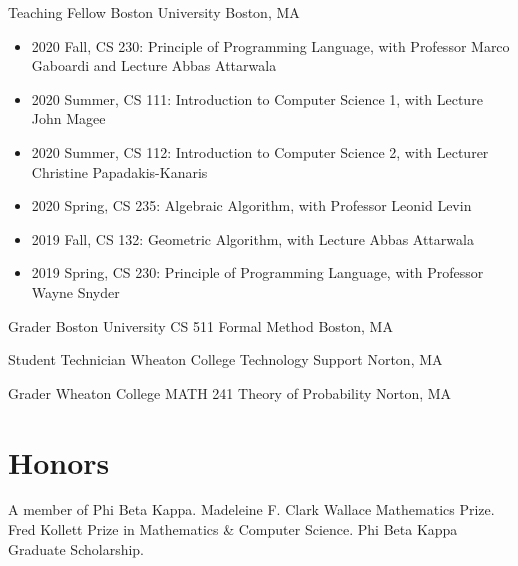 \documentclass[11pt,a4paper,roman]{moderncv}        %
\begin{document}
{Teaching Fellow}
{Boston University}
{Boston, MA}{}
{
  \begin{itemize}[nosep]
    \item 2020 Fall, CS 230: Principle of Programming Language,
      with Professor Marco Gaboardi and Lecture Abbas Attarwala
    \item 2020 Summer, CS 111: Introduction to Computer Science 1,
      with Lecture John Magee
    \item 2020 Summer, CS 112: Introduction to Computer Science 2,
      with Lecturer Christine Papadakis-Kanaris
    \item 2020 Spring, CS 235: Algebraic Algorithm,  
      with Professor Leonid Levin
    \item 2019 Fall, CS 132: Geometric Algorithm, 
      with Lecture Abbas Attarwala
    \item 2019 Spring, CS 230: Principle of Programming Language, 
      with Professor Wayne Snyder
  \end{itemize}
}

{Grader}
{Boston University CS 511 Formal Method}
{Boston, MA}{}{}

{Student Technician}
{Wheaton College Technology Support}
{Norton, MA}{}{}

{Grader}
{Wheaton College MATH 241 Theory of Probability}
{Norton, MA}{}{}



\section{Honors}
 {A member of Phi Beta Kappa.}
 {
  Madeleine F. Clark Wallace Mathematics Prize. \newline
  Fred Kollett Prize in Mathematics \& Computer Science. \newline
  Phi Beta Kappa Graduate Scholarship.
}
\end{document}
